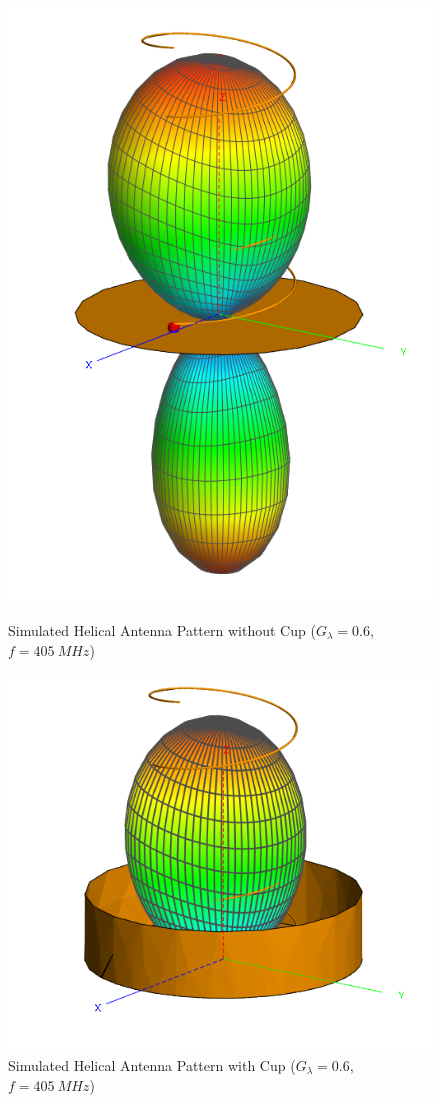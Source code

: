 \begin{figure}[!htb]
  \begin{minipage}{.49\textwidth}
    \centering
    \includegraphics[width=0.5\linewidth]{helix5_pattern_405MHz}
    \caption{Simulated Helical Antenna Pattern without Cup ($G_\lambda = 0.6$, $f=\SI{405}{MHz}$)}
    \label{fig:helix5_pattern_405MHz}
  \end{minipage}
  \begin{minipage}{.49\textwidth}
    \centering
    \includegraphics[width=0.85\linewidth]{helix6_pattern_405MHz}
    \caption{Simulated Helical Antenna Pattern with Cup ($G_\lambda = 0.6$, $f=\SI{405}{MHz}$)}
    \label{fig:helix6_pattern_405MHz}
  \end{minipage}
\end{figure}

